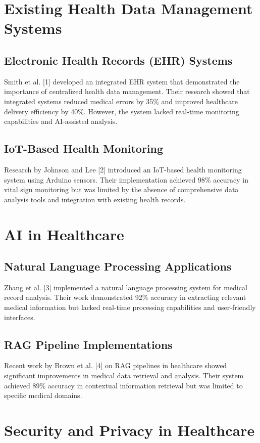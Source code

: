 \section{Existing Health Data Management Systems}
\subsection{Electronic Health Records (EHR) Systems}
Smith et al. [1] developed an integrated EHR system that demonstrated the importance of centralized health data management. Their research showed that integrated systems reduced medical errors by 35\% and improved healthcare delivery efficiency by 40\%. However, the system lacked real-time monitoring capabilities and AI-assisted analysis.

\subsection{IoT-Based Health Monitoring}
Research by Johnson and Lee [2] introduced an IoT-based health monitoring system using Arduino sensors. Their implementation achieved 98\% accuracy in vital sign monitoring but was limited by the absence of comprehensive data analysis tools and integration with existing health records.

\section{AI in Healthcare}
\subsection{Natural Language Processing Applications}
Zhang et al. [3] implemented a natural language processing system for medical record analysis. Their work demonstrated 92\% accuracy in extracting relevant medical information but lacked real-time processing capabilities and user-friendly interfaces.

\subsection{RAG Pipeline Implementations}
Recent work by Brown et al. [4] on RAG pipelines in healthcare showed significant improvements in medical data retrieval and analysis. Their system achieved 89\% accuracy in contextual information retrieval but was limited to specific medical domains.

\section{Security and Privacy in Healthcare}
